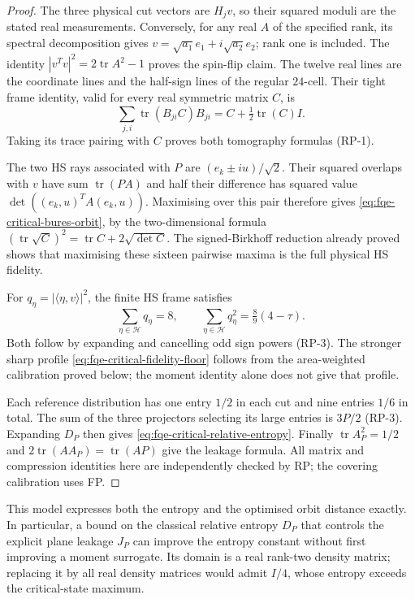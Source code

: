 \begin{proof}
The three physical cut vectors are $H_jv$, so their squared moduli are
the stated real measurements. Conversely, for any real $A$ of the
specified rank, its spectral decomposition gives
$v=\sqrt{a_1}e_1+i\sqrt{a_2}e_2$; rank one is included.
The identity $|v^Tv|^2=2\operatorname{tr}A^2-1$ proves the spin-flip claim.
The twelve real lines are the coordinate lines and the half-sign lines
of the regular $24$-cell. Their tight frame identity, valid for every
real symmetric matrix $C$, is
\[
 \sum_{j,i}\operatorname{tr}(B_{ji}C)B_{ji}
                    =C+\tfrac12\operatorname{tr}(C)I.
\]
Taking its trace pairing with $C$ proves both tomography formulas (RP-1).

The two HS rays associated with $P$ are $(e_k\pm iu)/\sqrt2$.
Their squared overlaps with $v$ have sum $\operatorname{tr}(PA)$ and
half their difference has squared value
$\det((e_k,u)^TA(e_k,u))$. Maximising over this pair therefore gives
\eqref{eq:fqe-critical-bures-orbit}, by the two-dimensional formula
$(\operatorname{tr}\sqrt C)^2=\operatorname{tr}C+2\sqrt{\det C}$.
The signed-Birkhoff reduction already proved shows that maximising
these sixteen pairwise maxima is the full physical HS fidelity.

For $q_\eta=|\langle\eta,v\rangle|^2$, the finite HS frame satisfies
\[
 \sum_{\eta\in\mathcal H}q_\eta=8,\qquad
 \sum_{\eta\in\mathcal H}q_\eta^2=\tfrac89(4-\tau).
\]
Both follow by expanding and cancelling odd sign powers (RP-3).
The stronger sharp profile \eqref{eq:fqe-critical-fidelity-floor} follows
from the area-weighted calibration proved below; the moment identity
alone does not give that profile.

Each reference distribution has one entry $1/2$ in each cut and nine
entries $1/6$ in total. The sum of the three projectors selecting its
large entries is $3P/2$ (RP-3). Expanding $D_P$ then gives
\eqref{eq:fqe-critical-relative-entropy}. Finally
$\operatorname{tr}A_P^2=1/2$ and
$2\operatorname{tr}(AA_P)=\operatorname{tr}(AP)$ give the leakage formula.
All matrix and compression identities here are independently checked by RP;
the covering calibration uses FP.
\end{proof}



This model expresses both the entropy and the optimised orbit distance exactly.
In particular, a bound on the classical relative entropy $D_P$ that
controls the explicit plane leakage $J_P$ can improve the entropy
constant without first improving a moment surrogate. Its domain is a
real rank-two density matrix; replacing it by all real density matrices
would admit $I/4$, whose entropy exceeds the critical-state maximum.
